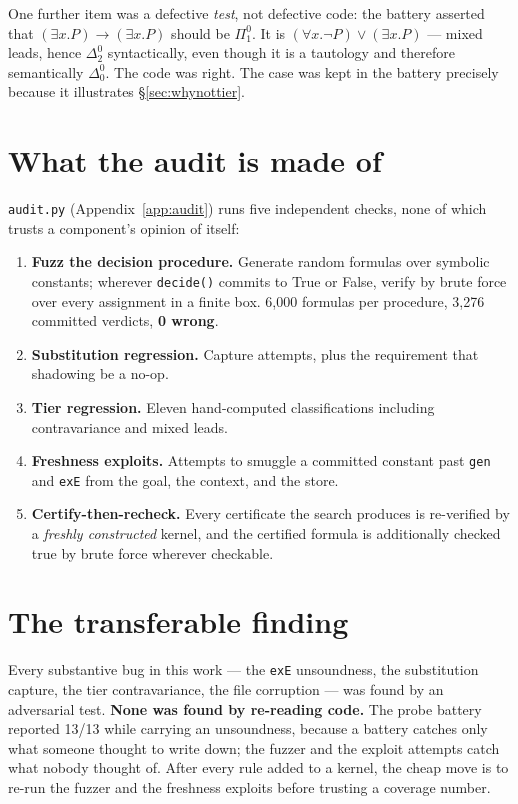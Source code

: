 \documentclass[11pt,a4paper]{article}
\newcommand{\Pai}[2]{\Pi^{#1}_{#2}}
\newcommand{\Del}[2]{\Delta^{#1}_{#2}}
\begin{document}
One further item was a defective \emph{test}, not defective code: the battery
asserted that $(\exists x.P) \to (\exists x.P)$ should be $\Pai{0}{1}$. It is
$(\forall x.\lnot P) \vee (\exists x.P)$ --- mixed leads, hence $\Del{0}{2}$
syntactically, even though it is a tautology and therefore semantically
$\Del{0}{0}$. The code was right. The case was kept in the battery precisely
because it illustrates \S\ref{sec:whynottier}.

\section{What the audit is made of}

\texttt{audit.py} (Appendix~\ref{app:audit}) runs five independent checks, none
of which trusts a component's opinion of itself:

\begin{enumerate}
\item \textbf{Fuzz the decision procedure.} Generate random formulas over
symbolic constants; wherever \texttt{decide()} commits to True or False, verify
by brute force over every assignment in a finite box. 6{,}000 formulas per
procedure, 3{,}276 committed verdicts, \textbf{0 wrong}.
\item \textbf{Substitution regression.} Capture attempts, plus the requirement
that shadowing be a no-op.
\item \textbf{Tier regression.} Eleven hand-computed classifications including
contravariance and mixed leads.
\item \textbf{Freshness exploits.} Attempts to smuggle a committed constant
past \texttt{gen} and \texttt{exE} from the goal, the context, and the store.
\item \textbf{Certify-then-recheck.} Every certificate the search produces is
re-verified by a \emph{freshly constructed} kernel, and the certified formula is
additionally checked true by brute force wherever checkable.
\end{enumerate}

\section{The transferable finding}

Every substantive bug in this work --- the \texttt{exE} unsoundness, the
substitution capture, the tier contravariance, the file corruption --- was found
by an adversarial test. \textbf{None was found by re-reading code.} The probe
battery reported 13/13 while carrying an unsoundness, because a battery catches
only what someone thought to write down; the fuzzer and the exploit attempts
catch what nobody thought of. After every rule added to a kernel, the cheap
move is to re-run the fuzzer and the freshness exploits before trusting a
coverage number.
\end{document}
